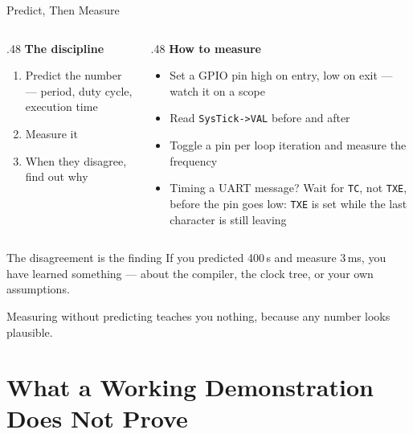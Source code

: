 \documentclass[9pt,aspectratio=169,xcolor=table]{beamer}
\begin{document}
\begin{frame}{Predict, Then Measure}
    \begin{columns}[T]
    \begin{column}{.48\textwidth}
        \textbf{The discipline}
        \begin{enumerate}
            \item \alert{Predict} the number --- period, duty cycle, execution
                  time
            \item \alert{Measure} it
            \item When they disagree, \alert{find out why}
        \end{enumerate}
    \end{column}
    \begin{column}{.48\textwidth}
        \textbf{How to measure}
        {\small
        \begin{itemize}\itemsep1pt
            \item Set a GPIO pin high on entry, low on exit --- watch it on a
                  scope
            \item Read \texttt{SysTick->VAL} before and after
            \item Toggle a pin per loop iteration and measure the frequency
            \item Timing a UART message? Wait for \alert{\texttt{TC}}, not \texttt{TXE}, before the pin goes low: \texttt{TXE} is set while the last character is still leaving
        \end{itemize}}
    \end{column}
    \end{columns}

    \vspace{3mm}
    \begin{block}{The disagreement is the finding}
        If you predicted 400\,\textmu s and measure 3\,ms, you have learned
        something --- about the compiler, the clock tree, or your own assumptions.

        \vspace{1mm}
        \alert{Measuring without predicting teaches you nothing}, because any
        number looks plausible.
    \end{block}
\end{frame}


\section{What a Working Demonstration Does Not Prove}
\end{document}
